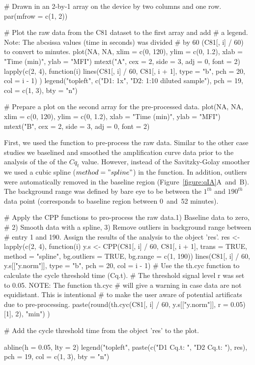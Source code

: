 \begin{example}
# Drawn in an 2-by-1 array on the device by two columns and one row.
par(mfrow = c(1, 2))

# Plot the raw data from the C81 dataset to the first array and add
# a legend. Note: The abcsissa values (time in seconds) was divided 
# by 60 (C81[, i] / 60) to convert to minutes.
plot(NA, NA, xlim = c(0, 120), ylim = c(0, 1.2), xlab = "Time (min)", ylab = "MFI")
mtext("A", cex = 2, side = 3, adj = 0, font = 2)
lapply(c(2, 4), function(i) {
  lines(C81[, i] / 60, C81[, i + 1], type = "b", pch = 20, col = i - 1)
})
legend("topleft", c("D1: 1x", "D2: 1:10 diluted sample"), pch = 19, col = c(1, 3), 
       bty = "n")

# Prepare a plot on the second array for the pre-processed data.
plot(NA, NA, xlim = c(0, 120), ylim = c(0, 1.2), xlab = "Time (min)", ylab = "MFI")
mtext("B", cex = 2, side = 3, adj = 0, font = 2)
\end{example}

First, we used the  function to pre-process the raw data. Similar to 
the other case studies we baselined and smoothed the amplification curve data 
prior to the analysis of the of the $Cq_{t}$ value. However, instead of the 
Savitzky-Golay smoother we used a cubic spline ($method = "spline"$) in the 
 function. In addition, outliers were automatically removed in the 
baseline region (Figure~\ref{figure:qIA}A~and~B). The background range was 
defined by bare eye to be between the $1^{th}$ and $190^{th}$ data point 
(corresponds to baseline region between 0~and~52 minutes). 

\begin{example}
# Apply the CPP functions to pro-process the raw data.1) Baseline data to zero, 
# 2) Smooth data with a spline, 3) Remove outliers in background range between 
# entry 1 and 190. Assign the results of the analysis to the object 'res'.
res <- lapply(c(2, 4), function(i) {
  y.s <- CPP(C81[, i] / 60, C81[, i + 1],
             trans = TRUE, 
             method = "spline",
             bg.outliers = TRUE,
             bg.range = c(1, 190))
  lines(C81[, i] / 60, y.s[["y.norm"]], type = "b", pch = 20, col = i - 1)
  # Use the th.cyc function to calculate the cycle threshold time (Cq.t). 
  # The threshold signal level r was set to 0.05. NOTE: The function th.cyc
  # will give a warning in case data are not equidistant. This is intentional
  # to make the user aware of potential artificats due to pre-processing.
  paste(round(th.cyc(C81[, i] / 60, y.s[["y.norm"]], r = 0.05)[1], 2), "min")
})

# Add the cycle threshold time from the object 'res' to the plot.

abline(h = 0.05, lty = 2)
legend("topleft", paste(c("D1 Cq.t: ", "D2 Cq.t: "), res), pch = 19, 
       col = c(1, 3), bty = "n")
\end{example}

